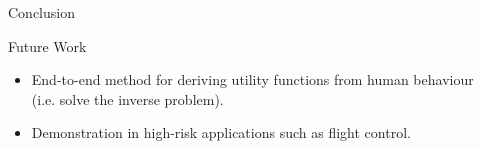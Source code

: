 \documentclass[final]{beamer}
\newlength{\sepwid}
\newlength{\onecolwid}
\begin{document}
\begin{frame}
\begin{columns}[t]
\begin{column}{\onecolwid}
\begin{exampleblock}{Conclusion}
\end{exampleblock}

\begin{exampleblock}{Future Work}

\begin{itemize}
    \item End-to-end method for deriving utility functions from human behaviour (i.e. solve the inverse problem).
    \item Demonstration in high-risk applications such as flight control.
\end{itemize}

\end{exampleblock}

\end{column} %

\begin{column}{\sepwid}\end{column} %

\end{columns} %

\end{frame} %
\end{document}
